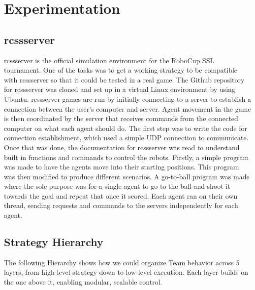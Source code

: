 \section{Experimentation}

\subsection{rcssserver}
rcssserver is the official simulation environment for the RoboCup SSL tournament. One of the tasks was to get a working strategy to be compatible with rcssserver so that it could be tested in a real game. The Github repository for rcssserver was cloned and set up in a virtual Linux environment by using Ubuntu. rcssserver games are run by initially connecting to a server to establish a connection between the user's computer and server. Agent movement in the game is then coordinated by the server that receives commands from the connected computer on what each agent should do. The first step was to write the code for connection establishment, which used a simple UDP connection to communicate. Once that was done, the documentation for rcssserver was read to understand built in functions and commands to control the robots. Firstly, a simple program was made to have the agents move into their starting positions. This program was then modified to produce different scenarios. A go-to-ball program was made where the sole purpose was for a single agent to go to the ball and shoot it towards the goal and repeat that once it scored. Each agent ran on their own thread, sending requests and commands to the servers independently for each agent.

\subsection{Strategy Hierarchy}
The following Hierarchy shows how we could organize Team behavior across 5 layers, from high-level strategy down to low-level execution. Each layer builds on the one above it, enabling modular, scalable control.

